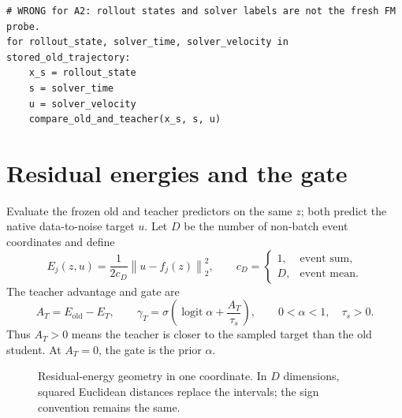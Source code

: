 \documentclass[11pt,a4paper]{article}
\newcommand{\norm}[1]{\left\lVert #1\right\rVert}
\newcommand{\logit}{\operatorname{logit}}
\newcommand{\old}{\mathrm{old}}
\theoremstyle{plain}
\theoremstyle{definition}
\begin{document}
\begin{lstlisting}[style=badpython,caption={Bad: coupling the probe to stored ODE steps changes the evidence distribution.}]
# WRONG for A2: rollout states and solver labels are not the fresh FM probe.
for rollout_state, solver_time, solver_velocity in stored_old_trajectory:
    x_s = rollout_state
    s = solver_time
    u = solver_velocity
    compare_old_and_teacher(x_s, s, u)
\end{lstlisting}

\section{Residual energies and the gate}
\label{sec:gate}

Evaluate the frozen old and teacher predictors on the same $z$; both predict the native
data-to-noise target $u$.  Let $D$ be the number of non-batch event coordinates and define
\begin{equation}
E_j(z,u)=\frac{1}{2c_D}\norm{u-f_j(z)}_2^2,
\qquad
c_D=
\begin{cases}
1,&\text{event sum},\\
D,&\text{event mean}.
\end{cases}
\label{eq:energies}
\end{equation}
The teacher advantage and gate are
\begin{equation}
A_T=E_{\old}-E_T,
\qquad
\gamma_T=\sigma\!\left(\logit\alpha+\frac{A_T}{\tau_s}\right),
\qquad 0<\alpha<1,\quad \tau_s>0.
\label{eq:gate}
\end{equation}
Thus $A_T>0$ means the teacher is closer to the sampled target than the old student.  At
$A_T=0$, the gate is the prior $\alpha$.

\begin{figure}[htbp]
\centering
{}
\caption{Residual-energy geometry in one coordinate.  In $D$ dimensions, squared Euclidean
distances replace the intervals; the sign convention remains the same.}
\label{fig:residual-geometry}
\end{figure}
\end{document}
